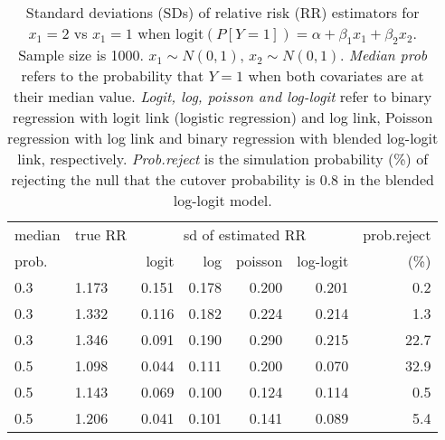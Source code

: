 \documentclass[12pt,a4paper]{article}
\begin{document}
\begin{table}[H] 
\small\sf\centering 
\caption{Standard deviations (SDs) of relative risk (RR) estimators for $x_1=2$ vs $x_1=1$ when $\mbox{logit}(P[Y=1])=\alpha+\beta_1 x_1 + \beta_2 x_2$. Sample size is 1000. $x_1 \sim $$N(0,1)$, $x_2 \sim N(0,1)$. {\it Median prob} refers to the probability that $Y=1$ when both covariates are at their median value. {\it Logit, log, poisson and log-logit} refer to binary regression with logit link (logistic regression) and log link, Poisson regression with log link and binary regression with blended log-logit link, respectively. {\it Prob.reject} is the simulation probability (\%) of rejecting the null that the cutover probability is $0.8$ in the blended log-logit model.} 
\begin{tabular}{llrrrrr} 
\toprule 
median & true RR & \multicolumn{4}{c}{sd of estimated RR} & prob.reject \\ 
prob. & & logit & log & poisson & log-logit  & (\%) \\ \midrule 
0.3 & 1.173 & 0.151 & 0.178 & 0.200 & 0.201 &  0.2 \\  
0.3 & 1.332 & 0.116 & 0.182 & 0.224 & 0.214 &  1.3 \\  
0.3 & 1.346 & 0.091 & 0.190 & 0.290 & 0.215 & 22.7 \\  
0.5 & 1.098 & 0.044 & 0.111 & 0.200 & 0.070 & 32.9 \\  
0.5 & 1.143 & 0.069 & 0.100 & 0.124 & 0.114 &  0.5 \\  
0.5 & 1.206 & 0.041 & 0.101 & 0.141 & 0.089 &  5.4 \\  
\bottomrule 
\end{tabular} 
\end{table} 
\end{document}
